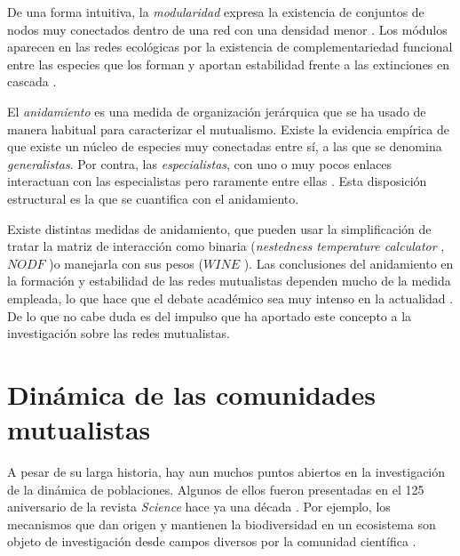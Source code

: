 De una forma intuitiva, la \textit{modularidad} expresa la existencia de conjuntos de nodos muy conectados dentro de una red con una densidad menor \cite{newman2006modularity}. Los módulos aparecen en las redes ecológicas por la existencia de complementariedad funcional entre las especies que los forman y aportan estabilidad frente a las extinciones en cascada \cite{olesen2007modularity, thebault2010stability, stouffer2011compartmentalization}.

El \textit{anidamiento} es una medida de organización jerárquica \cite{atmar1986nested} que se ha usado de manera habitual para caracterizar el mutualismo. Existe la evidencia empírica de que existe un núcleo de especies muy conectadas entre sí, a las que se denomina \textit{generalistas}. Por contra, las \textit{especialistas}, con uno o muy pocos enlaces interactuan con las especialistas pero raramente entre ellas \cite{bascompte2003nested, krishna2008neutral}. Esta disposición estructural es la que se cuantifica con el anidamiento.

Existe distintas medidas de anidamiento, que pueden usar la simplificación de tratar la matriz de interacción como binaria (\textit{nestedness temperature calculator} \cite{atmar1995nestedness}, $NODF$ \cite{almeida2008consistent})o manejarla con sus pesos ($WINE$ \cite{galeano2009weighted}). Las conclusiones del anidamiento en la formación y estabilidad de las redes mutualistas dependen mucho de la medida empleada, lo que hace que el debate académico sea muy intenso en la actualidad \cite{staniczenko2013ghost, strona2015new}. De lo que no cabe duda es del impulso que ha aportado este concepto a la investigación sobre las redes mutualistas.

\section{Dinámica de las comunidades mutualistas}

A pesar de su larga historia, hay aun muchos puntos abiertos en la investigación de la dinámica de poblaciones. Algunos de ellos fueron presentadas en el 125 aniversario de la revista {\em Science} hace ya una década  \cite{kennedy2005,pennisi2005,stokstad2005}. Por ejemplo, los mecanismos que dan origen y mantienen la biodiversidad en un ecosistema son objeto de investigación desde campos diversos por la comunidad científica \cite{williams2000,dunne2002biodiversity,olesen2007modularity,allesina2008,bascompte2009,saavedra2009,bastolla2009,fortuna2010nestedness,encinas2012}.  

